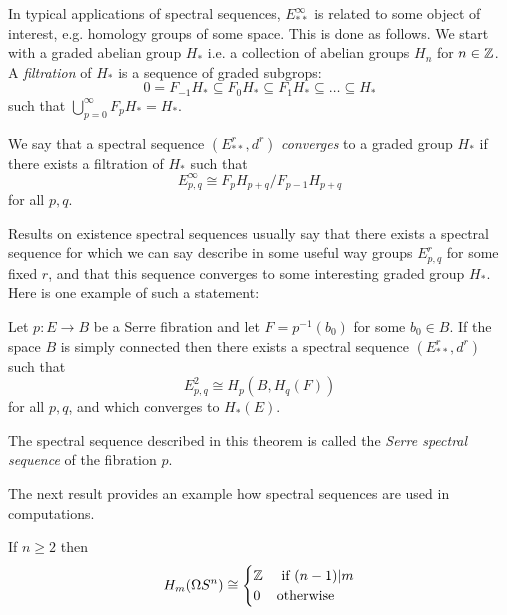 In typical applications of spectral sequences, $E^{\infty}_{\ast\ast}$ is related to some 
object of interest, e.g. homology groups of some space. This is done as follows. 
We start with a graded abelian group $H_{\ast}$ i.e. a collection of abelian groups 
$H_{n}$ for $n\in {\mathbb Z}$. A \emph{filtration} of $H_{\ast}$ is a sequence of graded subgrops: 
\[
0 = F_{-1}H_{\ast} \subseteq F_{0}H_{\ast} \subseteq F_{1}H_{\ast} 
\subseteq {\dots} \subseteq H_{\ast}
\]
such that $\bigcup_{p=0}^{\infty} F_{p}H_{\ast} = H_{\ast}$. 

\begin{definition}
We say that a spectral sequence $(E^{r}_{\ast\ast}, d^{r})$ \emph{converges} to 
a graded group $H_{\ast}$ if there exists a filtration of $H_{\ast}$ such that 
\[
E^{\infty}_{p, q} \cong F_{p}H_{p+q}/F_{p-1}H_{p+q}
\]
for all $p, q$.
\end{definition}


Results on existence spectral sequences usually say that there exists
a spectral sequence for which we can say describe in some useful way groups 
$E^{r}_{p, q}$ for some fixed $r$, and that this sequence converges to some 
interesting graded group $H_{\ast}$. Here is one example of such a statement: 

\begin{theorem}
\label{SERRE SS THM}
Let $p\colon E \to B$ be a Serre fibration and let $F = p^{-1}(b_{0})$ for some $b_{0}\in B$. 
If the space $B$ is simply connected then there exists a spectral sequence 
$(E^{r}_{\ast\ast}, d^{r})$ such that 
\[
E^{2}_{p, q} \cong H_{p}(B, H_{q}(F))
\]
for all $p, q$, and which converges to $H_{\ast}(E)$. 
\end{theorem}

The spectral sequence described in this theorem is called the 
\emph{Serre spectral sequence} of the fibration $p$.


The next result provides an example how spectral sequences are used in 
computations.
 
\begin{theorem}
\label{HOMOLOGY LOOP SPHERE THM}
If $n\geq 2$ then 
\[
H_{m}(\Omega S^{n}) \cong 
\begin{cases}
{\mathbb Z} & \text{ if } (n-1)|m \\
0  & \text{otherwise}
\end{cases}
\]
\end{theorem}

